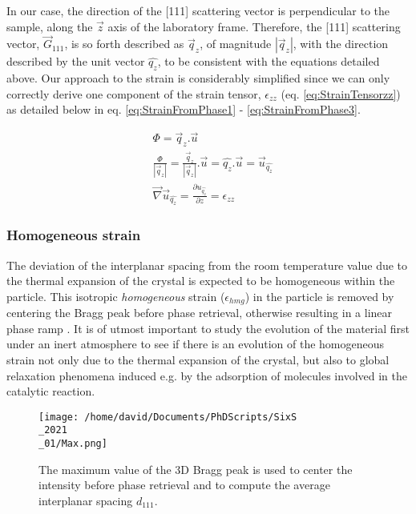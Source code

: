 In our case, the direction of the [111] scattering vector is perpendicular to the sample, along the $\vec{z}$ axis of the laboratory frame.
Therefore, the [111] scattering vector, $\vec{G}_{111}$, is so forth described as $\vec{q}_z$, of magnitude  $|\vec{q}_z|$, with the direction described by the unit vector  $\hat{q_z}$, to be consistent with the equations detailed above.
Our approach to the strain is considerably simplified since we can only correctly derive one component of the strain tensor, $\epsilon_{zz}$ (eq. \ref{eq:StrainTensorzz}) as detailed below in eq. \ref{eq:StrainFromPhase1} - \ref{eq:StrainFromPhase3}.

\begin{align}
    \label{eq:StrainFromPhase1}
    & \Phi =  \vec{q}_z.\vec{u} \\
    \label{eq:StrainFromPhase2}
    & \frac{\Phi}{|\vec{q}_z|} = \frac{\vec{q}_z}{|\vec{q}_z|}.\vec{u} = \hat{q_z}.\vec{u} = \vec{u}_{\hat{q_z}} \\
    \label{eq:StrainFromPhase3}
    & \vec{\nabla} \vec{u}_{\hat{q_z}} = \frac{\partial u_{\hat{q_z}}}{\partial z} = \epsilon_{zz}
\end{align}

\subsubsection{Homogeneous strain}

The deviation of the interplanar spacing from the room temperature value due to the thermal expansion of the crystal is expected to be homogeneous within the particle.
This isotropic \textit{homogeneous} strain ($\epsilon_{hmg}$) in the particle is removed by centering the Bragg peak before phase retrieval, otherwise resulting in a linear phase ramp \parencite{}.
It is of utmost important to study the evolution of the material first under an inert atmosphere to see if there is an evolution of the homogeneous strain not only due to the thermal expansion of the crystal, but also to global relaxation phenomena induced e.g. by the adsorption of molecules involved in the catalytic reaction.

\begin{figure}[!htb]
    \centering
    \texttt{[image: /home/david/Documents/PhDScripts/SixS\\\_2021\\\_01/Max.png]}
    \caption{
        The maximum value of the 3D Bragg peak is used to center the intensity before phase retrieval and to compute the average interplanar spacing $d_{111}$.
    }
    \label{fig:MaxPeak}
\end{figure}

